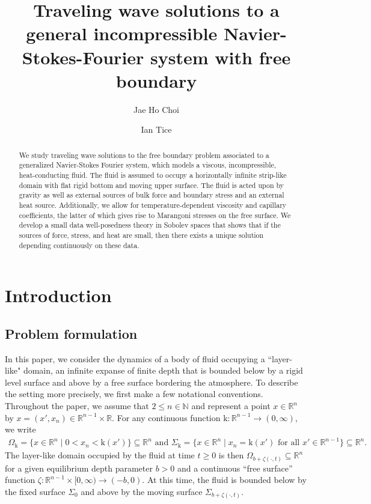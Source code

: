 \documentclass[11pt,letterpaper,reqno]{amsart}
\title[Traveling wave solutions to general N-S-F]{Traveling wave solutions to a general incompressible Navier-Stokes-Fourier system with free boundary}
\author{Jae Ho Choi}
\author{Ian Tice}
\numberwithin{equation}{section}
\begin{document}
\begin{abstract} 
We study traveling wave solutions to the free boundary problem associated to a generalized Navier-Stokes Fourier system, which models a viscous, incompressible, heat-conducting fluid.  The fluid is assumed to occupy a horizontally infinite strip-like domain with flat rigid bottom and moving upper surface.  The fluid is acted upon by gravity as well as external sources of bulk force and boundary stress and an external heat source.  Additionally, we allow for temperature-dependent viscosity and capillary coefficients, the latter of which gives rise to  Marangoni stresses on the free surface.  We develop a small data well-posedness theory in Sobolev spaces that shows that if the sources of force, stress, and heat are small, then there exists a unique solution depending continuously on these data.  
\end{abstract}

\maketitle



\section{Introduction}

\subsection{Problem formulation}
In this paper, we consider the dynamics of a body of fluid occupying a ``layer-like" domain, an infinite expanse of finite depth that is bounded below by a rigid level surface and above by a free surface bordering the atmosphere. To describe the setting more precisely, we first make a few notational conventions. Throughout the paper, we assume that \(2 \leq n \in \mathbb{N}\) and represent a point \(x \in \mathbb{R}^{n}\) by \(x=(x',x_{n}) \in \mathbb{R}^{n-1} \times \mathbb{R}\). For any continuous function \(\mathrm{k}: \mathbb{R}^{n-1} \to (0,\infty)\), we write
\begin{align}
    \Omega_{\mathrm{k}} =\{x \in \mathbb{R}^{n} \mid 0<x_{n}< \mathrm{k}(x')\} \subseteq \mathbb{R}^{n} \text{ and }
    \Sigma_{\mathrm{k}} =\{x \in \mathbb{R}^{n} \mid x_n = \mathrm{k}(x') \mbox{ for all \(x' \in \mathbb{R}^{n-1}\)}\} \subseteq \mathbb{R}^{n}.
\end{align}
The layer-like domain occupied by the fluid at time \(t \geq 0\) is then \(\Omega_{b+\zeta(\cdot, t)} \subseteq \mathbb{R}^{n}\) for a given equilibrium depth parameter  \(b>0\) and a continuous ``free surface'' function \(\zeta: \mathbb{R}^{n-1} \times [0,\infty) \to (-b,0)\). At this time, the fluid is bounded below by the fixed surface \(\Sigma_{0}\) and above by the moving surface \(\Sigma_{b+\zeta(\cdot,t)}\).
\end{document}

